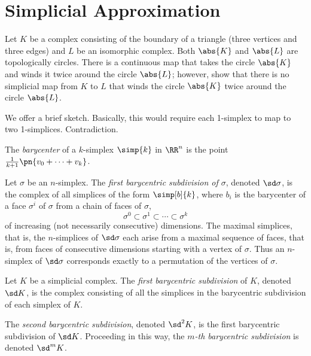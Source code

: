 \section{Simplicial Approximation}
\begin{problem}[15.23]
  Let $K$ be a complex consisting of the boundary of a triangle (three vertices
  and three edges) and $L$ be an isomorphic complex. Both $\abs{K}$ and
  $\abs{L}$ are topologically circles. There is a continuous map that takes the
  circle $\abs{K}$ and winds it twice around the circle $\abs{L}$; however, show
  that there is no simplicial map from $K$ to $L$ that winds the circle
  $\abs{K}$ twice around the circle $\abs{L}$.
\end{problem}
\begin{solution}
  We offer a brief sketch. Basically, this would require each 1-simplex to map
  to two 1-simplices. Contradiction.
\end{solution}
\begin{definition}[Barycenter]
  The \emph{barycenter} of a $k$-simplex $\simp{k}$ in $\RR^n$ is the point
  $\frac{1}{k+1} \pn{v_0 + \cdots + v_k}$.
\end{definition}
\begin{definition}
  Let $\sigma$ be an $n$-simplex. The \emph{first barycentric subdivision of
    $\sigma$}, denoted $\sd \sigma$, is the complex of all simplices of the form
  $\simp[b]{k}$, where $b_i$ is the barycenter of a face $\sigma^i$ of $\sigma$
  from a chain of faces of $\sigma$,
  \[
    \sigma^0 \subset \sigma^1 \subset \cdots \subset \sigma^k
  \]
  of increasing (not necessarily consecutive) dimensions. The maximal simplices,
  that is, the $n$-simplices of $\sd \sigma$ each arise from a maximal sequence
  of faces, that is, from faces of consecutive dimensions starting with a vertex
  of $\sigma$. Thus an $n$-simplex of $\sd \sigma$ corresponds exactly to a
  permutation of the vertices of $\sigma$.
\end{definition}
\begin{definition}[$\sd K$]
  Let $K$ be a simplicial complex. The \emph{first barycentric subdivision} of
  $K$, denoted $\sd K$, is the complex consisting of all the simplices in the
  barycentric subdivision of each simplex of $K$.
\end{definition}
\begin{definition}
  The \emph{second barycentric subdivision}, denoted $\sd^2 K$, is the first
  barycentric subdivision of $\sd K$. Proceeding in this way, the \emph{$m$-th
    barycentric subdivision} is denoted $\sd^m K$.
\end{definition}
